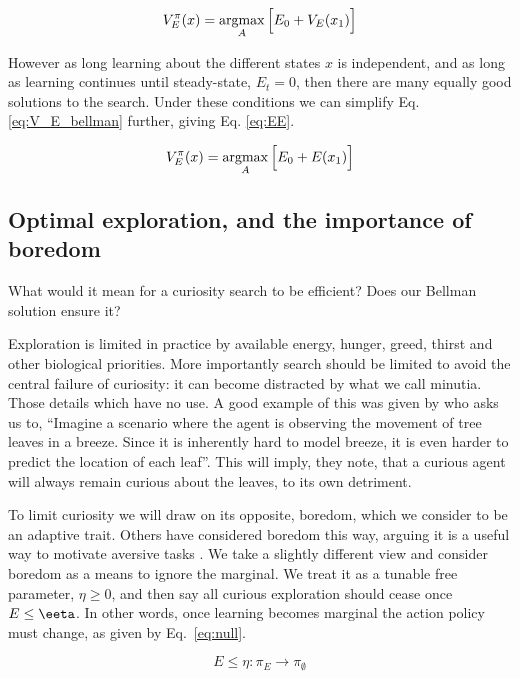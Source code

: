 \begin{equation}
	\label{eq:V_E_bellman} 
	V^{\pi}_E(x) = \operatorname*{argmax}_A \Big [ E_0 + V_E(x_1) \Big ]
\end{equation}

However as long learning about the different states $x$ is independent, and as long as learning continues until steady-state, $E_t =0$, then there are many equally good solutions to the search. Under these conditions we can simplify Eq. \ref{eq:V_E_bellman} further, giving Eq. \ref{eq:EE}. 

\begin{equation}
	\label{eq:EE} 
	V^{\pi}_E(x) = \operatorname*{argmax}_A \Big [ E_0 + E(x_1) \Big ]
\end{equation}

\subsection{Optimal exploration, and the importance of boredom}
What would it mean for a curiosity search to be efficient? Does our Bellman solution ensure it?

Exploration is limited in practice by available energy, hunger, greed, thirst and other biological priorities. More importantly search should be limited to avoid the central failure of curiosity: it can become distracted by what we call minutia. Those details which have no use. A good example of this was given by \cite{Pathak2017} who asks us to, ``Imagine a scenario where the agent is observing the movement of tree leaves in a breeze. Since it is inherently hard to model breeze, it is even harder to predict the location of each leaf''. This will imply, they note, that a curious agent will always remain curious about the leaves, to its own detriment. 

To limit curiosity we will draw on its opposite, boredom, which we consider to be an adaptive trait. Others have considered boredom this way, arguing it is a useful way to motivate aversive tasks \citep{Bench2013}. We take a slightly different view and consider boredom as a means to ignore the marginal. We treat it as a tunable free parameter, $\eta \ge 0$, and then say all curious exploration should cease once $E \le \eeta$. In other words, once learning becomes marginal the action policy must change, as given by Eq.~\ref{eq:null}. 

\begin{equation}
	\label{eq:null}
	E \le \eta : \pi_E \rightarrow \pi_{\emptyset}
\end{equation}


